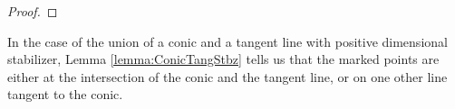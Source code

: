 \documentclass{amsart}
\numberwithin{equation}{section}
\theoremstyle{definition}
\begin{document}
\begin{proof}











    
\end{proof}










In the case of the union of a conic and a tangent line with positive dimensional stabilizer, Lemma \ref{lemma:ConicTangStbz} tells us that the marked points are either at the intersection of the conic and the tangent line, or on one other line tangent to the conic.
\end{document}
